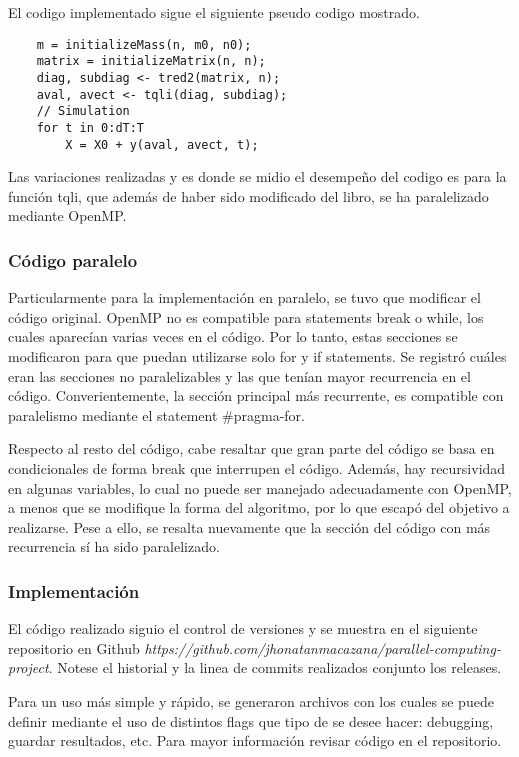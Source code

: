 El codigo implementado sigue el siguiente pseudo codigo mostrado. 
\begin{verbatim}
	m = initializeMass(n, m0, n0);
	matrix = initializeMatrix(n, n);
	diag, subdiag <- tred2(matrix, n);
	aval, avect <- tqli(diag, subdiag);
	// Simulation
	for t in 0:dT:T
		X = X0 + y(aval, avect, t);
\end{verbatim}

Las variaciones realizadas y es donde se midio el desempeño del codigo es para la función tqli, que además de haber sido modificado del libro, se ha paralelizado mediante OpenMP.


\subsubsection{Código paralelo}
Particularmente para la implementación en paralelo, se tuvo que modificar el código original. OpenMP no es compatible para statements break o while, los cuales aparecían varias veces en el código. Por lo tanto, estas secciones se modificaron para que puedan utilizarse solo for y if statements. Se registró cuáles eran las secciones no paralelizables y las que tenían mayor recurrencia en el código. Converientemente, la sección principal más recurrente, es compatible con paralelismo mediante el statement \#pragma-for. 

Respecto al resto del código, cabe resaltar que gran parte del código se basa en condicionales de forma break que interrupen el código. Además, hay recursividad en algunas variables, lo cual no puede ser manejado adecuadamente con OpenMP, a menos que se modifique la forma del algoritmo, por lo que escapó del objetivo a realizarse. Pese a ello, se resalta nuevamente que la sección del código con más recurrencia sí ha sido paralelizado.

\subsubsection{Implementación}
El código realizado siguio el control de versiones  y se muestra en el siguiente repositorio en Github \textit{https://github.com/jhonatanmacazana/parallel-computing-project}. Notese el historial y la linea de commits realizados conjunto los releases.

Para un uso más simple y rápido, se generaron archivos  con los cuales se puede definir mediante el uso de distintos flags que tipo de se desee hacer: debugging, guardar resultados, etc. Para mayor información revisar código en el repositorio.

